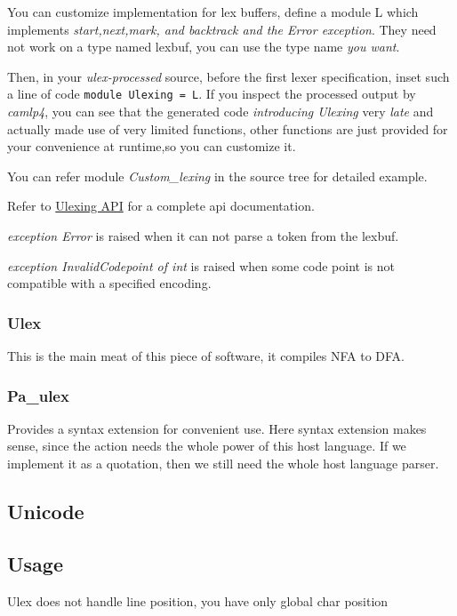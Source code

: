 You can customize implementation for lex buffers, define a module L
which implements \emph{start,next,mark, and backtrack and the Error
  exception}.  They need not work on a type named lexbuf, you can use
the type name \textit{you want}.

Then, in your \emph{ulex-processed} source, before the first lexer
specification, inset such a line of code \verb|module Ulexing = L|. If
you inspect the processed output by \textit{camlp4}, you can see that
the generated code \emph{introducing Ulexing } very \emph{late} and
actually made use of very limited functions, other functions are just
provided for your convenience at runtime,so you can customize it.

You can refer module \textit{Custom\_lexing} in the source tree for
detailed example.

Refer to
\href{http://www.seas.upenn.edu/~hongboz/hongbo_zhang_files/ulex/Ulexing.html}
{Ulexing API}
for a complete api documentation.

\textit{exception Error} is raised when it can not parse a token from
the lexbuf.

\textit{exception InvalidCodepoint of int} is raised when some code
point is not compatible with a specified encoding.

\subsubsection{Ulex}
\label{Ulex}

This is the main meat of this piece of software, it compiles
NFA to DFA.

\subsubsection{Pa\_ulex}
\label{sec:Pa_ulex} %

Provides a syntax extension for convenient use. Here syntax extension
makes sense, since the action needs the whole power of this host
language. If we implement it as a quotation, then we still need the
whole host language parser.

\subsection{Unicode}

\subsection{Usage}    
Ulex does not handle line position, you have only global char
position 


